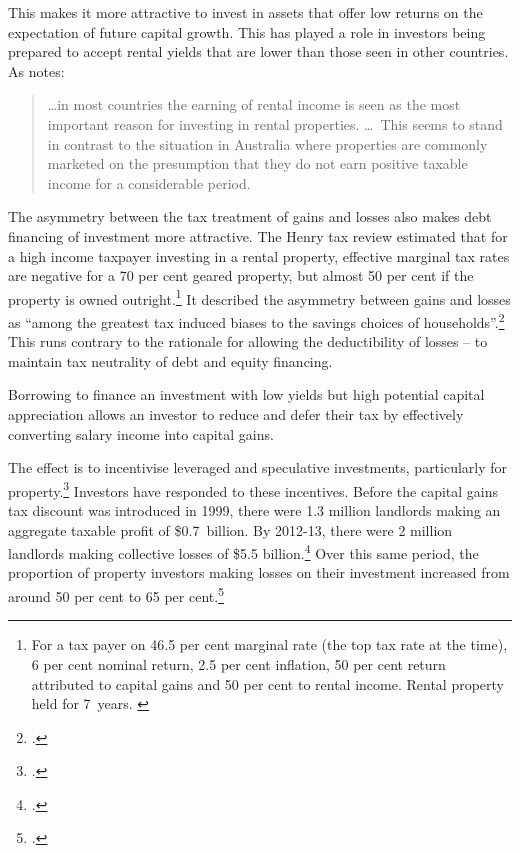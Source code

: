 \documentclass{grattan}\usepackage[]{graphicx}\usepackage[]{color}
\begin{document}
This makes it more attractive to invest in assets that offer low returns on the expectation of future capital growth. This has played a role in investors being prepared to accept rental yields that are lower than those seen in other countries. As \textcite[p.~42]{RBA2014} notes:

\begin{quote}
\dots in most countries the earning of rental income is seen as the most important reason for investing in rental properties. \dots\ This seems to stand in contrast to the situation in Australia where properties are commonly marketed on the presumption that they do not earn positive taxable income for a considerable period.
\end{quote}

The asymmetry between the tax treatment of gains and losses also makes debt financing of investment more attractive. The Henry tax review estimated that for a high income taxpayer investing in a rental property, effective marginal tax rates are negative for a 70 per cent geared property, but almost 50 per cent if the property is owned outright.\footnote{For a tax payer on 46.5 per cent marginal rate (the top tax rate at the time), 6 per cent nominal return, 2.5 per cent inflation, 50 per cent return attributed to capital gains and 50 per cent to rental income. Rental property held for 7~years. \textcite[p.~74]{Treasury2010}}  It described the asymmetry between gains and losses as ``among the greatest tax induced biases to the savings choices of households''.\footcite[p.~69]{Treasury2010}  This runs contrary to the rationale for allowing the deductibility of losses -- to maintain tax neutrality of debt and equity financing. 

Borrowing to finance an investment with low yields but high potential capital appreciation allows an investor to reduce and defer their tax by effectively converting salary income into capital gains. 

The effect is to incentivise leveraged and speculative investments, particularly for property.\footcite[p.~17]{Inquiry2014} Investors have responded to these incentives. Before the capital gains tax discount was introduced in 1999, there were 1.3 million landlords making an aggregate taxable profit of \$0.7~billion. By 2012-13, there were 2 million landlords making collective losses of \$5.5 billion.\footcites{Eslake2013}{ATO2015} Over this same period, the proportion of property investors making losses on their investment increased from around 50 per cent to 65 per cent.\footcite{ATO2014e} 
\end{document}
